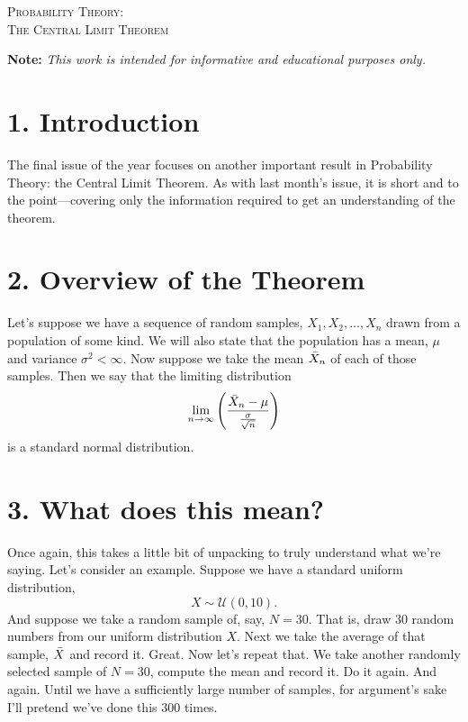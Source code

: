\documentclass[11pt]{article}
\begin{document}

\begin{tcolorbox}
\begin{center}
    \large
    \textsc{Probability Theory: \\ The Central Limit Theorem}
\end{center}
\end{tcolorbox}

\begin{center}
\textbf{Note:} \textit{This work is intended for informative and educational purposes only.}
\end{center}

\section*{1. Introduction}
The final issue of the year focuses on another important result in Probability Theory: the Central Limit Theorem. As with last month's issue, it is short and to the point––covering only the information required to get an understanding of the theorem. 

\section*{2. Overview of the Theorem}
Let's suppose we have a sequence of random samples, $X_1, X_2, \ldots, X_n$ drawn from a population of some kind. We will also state that the population has a mean, $\mu$ and variance $\sigma^2 < \infty$. Now suppose we take the mean $\Bar{X}_n$ of each of those samples. Then we say that the limiting distribution
\begin{equation}
    \lim_{n \rightarrow \infty} \left( \frac{\Bar{X}_n - \mu}{\frac{\sigma}{\sqrt{n}}}\right)
\end{equation}
is a standard normal distribution.

\section*{3. What does this mean?}
Once again, this takes a little bit of unpacking to truly understand what we're saying. Let's consider an example. Suppose we have a standard uniform distribution,
\begin{equation}
    X \sim \mathcal{U}(0,10).
\end{equation}
And suppose we take a random sample of, say, $N = 30$. That is, draw 30 random numbers from our uniform distribution $X$. Next we take the average of that sample, $\Bar{X}$ and record it. Great. Now let's repeat that. We take another randomly selected sample of $N=30$, compute the  mean and record it. Do it again. And again. Until we have a sufficiently large number of samples, for argument's sake I'll pretend we've done this 300 times.
\end{document}
